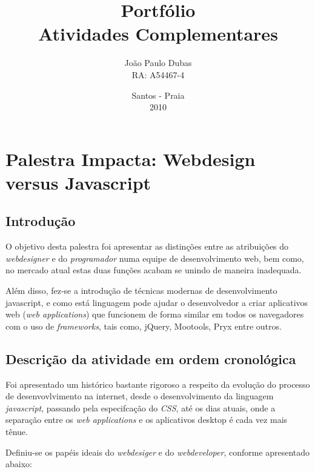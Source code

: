\documentclass[a4paper]{report}
\begin{document}
    \title{Portf\'{o}lio\\Atividades Complementares}
    \author{Jo\~{a}o Paulo Dubas\\RA: A54467-4}
    \date{Santos - Praia\\2010}

    \maketitle

    \tableofcontents

    \chapter[Webdesign versus Javascript]{Palestra Impacta: Webdesign versus
    Javascript}

        \section{Introdu\c{c}\~{a}o}
        O objetivo desta palestra foi apresentar as distin\c{c}\~{o}es entre as
        atribui\c{c}\~{o}es do \emph{webdesigner} e do \emph{programador} numa
        equipe de desenvolvimento web, bem como, no mercado atual estas
        duas fun\c{c}\~{o}es acabam se unindo de maneira inadequada.

        Al\'{e}m disso, fez-se a introdu\c{c}\~{a}o de t\'{e}cnicas modernas de
        desenvolvimento javascript, e como est\'{a} linguagem pode ajudar
        o desenvolvedor a criar aplicativos web (\emph{web applications})
        que funcionem de forma similar em todos os navegadores com o
        uso de \emph{frameworks}, tais como, jQuery, Mootools, Pryx
        entre outros.

        \section[Descri\c{c}\~{a}o atividade]{Descri\c{c}\~{a}o da atividade em
        ordem cronol\'{o}gica}
        Foi apresentado um hist\'{o}rico bastante rigoroso a respeito da
        evolu\c{c}\~{a}o do processo de desenvovlvimento na internet, desde o
        desenvolvimento da linguagem \emph{javascript}, passando pela
        especifca\c{c}\~{a}o do \emph{CSS}, at\'{e} os dias atuais, onde a
        separa\c{c}\~{a}o entre os \emph{web applications} e os aplicativos
        desktop \'{e} cada vez mais t\^{e}nue.

        Definiu-se os pap\'{e}is ideais do \emph{webdesiger} e do
        \emph{webdeveloper}, conforme apresentado abaixo:
\end{document}

